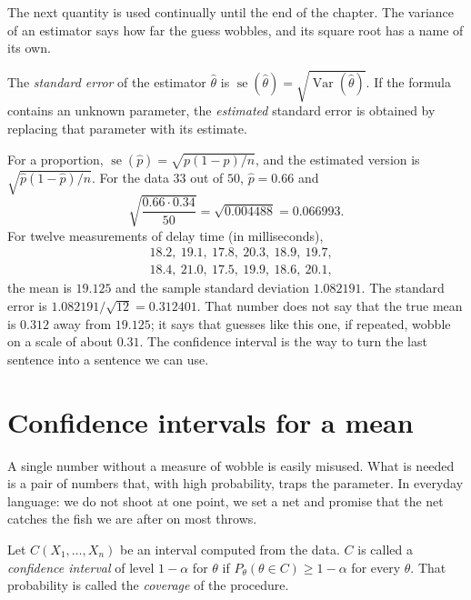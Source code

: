 The next quantity is used continually until the end of the chapter. The variance of an
estimator says how far the guess wobbles, and its square root has a name of its own.


\begin{definisi}
The \emph{standard error} of the estimator $\hat\theta$ is $\operatorname{se}(\hat\theta)
=\sqrt{\operatorname{Var}(\hat\theta)}$. If the formula contains an unknown parameter, the
\emph{estimated} standard error is obtained by replacing that parameter with its estimate.
\end{definisi}

For a proportion, $\operatorname{se}(\hat p)=\sqrt{p(1-p)/n}$, and the estimated version is
$\sqrt{\hat p(1-\hat p)/n}$. For the data $33$ out of $50$, $\hat p=0.66$ and
\[
\sqrt{\frac{0.66\cdot0.34}{50}}=\sqrt{0.004488}=0.066993 .
\]
For twelve measurements of delay time (in milliseconds),
\begin{align*}
&18.2,\ 19.1,\ 17.8,\ 20.3,\ 18.9,\ 19.7,\\
&18.4,\ 21.0,\ 17.5,\ 19.9,\ 18.6,\ 20.1,
\end{align*}
the mean is $19.125$ and the sample standard deviation $1.082191$. The standard error is
$1.082191/\sqrt{12}=0.312401$.
That number does not say that the true mean is $0.312$ away from
$19.125$; it says that guesses like this one, if repeated, wobble on a scale of about
$0.31$. The confidence interval is the way to turn the last sentence into a sentence we can
use.

\section{Confidence intervals for a mean}

A single number without a measure of wobble is easily misused. What is needed is a pair of
numbers that, with high probability, traps the parameter. In everyday language: we do not
shoot at one point, we set a net and promise that the net catches the fish we are after on most
throws.


\begin{definisi}
Let $C(X_1,\dots,X_n)$ be an interval computed from the data. $C$ is called a
\emph{confidence interval} of level $1-\alpha$ for $\theta$ if
$P_\theta(\theta\in C)\ge1-\alpha$ for every $\theta$. That probability is called the
\emph{coverage} of the procedure.
\end{definisi}

